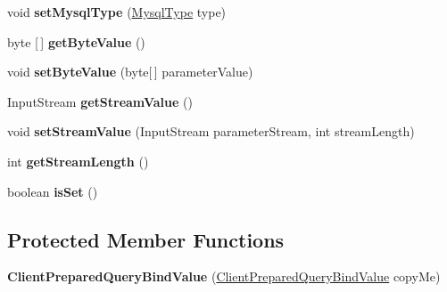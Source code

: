 \begin{DoxyCompactItemize}
\item 
\mbox{\label{classcom_1_1mysql_1_1cj_1_1_client_prepared_query_bind_value_a454d8f5fab8fd48d421a4678ad4aff40}} 
void {\bfseries set\+Mysql\+Type} (\mbox{\hyperlink{enumcom_1_1mysql_1_1cj_1_1_mysql_type}{Mysql\+Type}} type)
\item 
\mbox{\label{classcom_1_1mysql_1_1cj_1_1_client_prepared_query_bind_value_a4bd862b93770f5f4eca133257026a10c}} 
byte \mbox{[}$\,$\mbox{]} {\bfseries get\+Byte\+Value} ()
\item 
\mbox{\label{classcom_1_1mysql_1_1cj_1_1_client_prepared_query_bind_value_a2881b8e00374727ad118362e9c76b383}} 
void {\bfseries set\+Byte\+Value} (byte\mbox{[}$\,$\mbox{]} parameter\+Value)
\item 
\mbox{\label{classcom_1_1mysql_1_1cj_1_1_client_prepared_query_bind_value_a57dcbdd8ef4f98c2142bf6c6ee217035}} 
Input\+Stream {\bfseries get\+Stream\+Value} ()
\item 
\mbox{\label{classcom_1_1mysql_1_1cj_1_1_client_prepared_query_bind_value_a91a77d92aa03fd7a0ada64374a25e2fb}} 
void {\bfseries set\+Stream\+Value} (Input\+Stream parameter\+Stream, int stream\+Length)
\item 
\mbox{\label{classcom_1_1mysql_1_1cj_1_1_client_prepared_query_bind_value_aa3af5bfb0e74d1101afa4f093fdce32b}} 
int {\bfseries get\+Stream\+Length} ()
\item 
\mbox{\label{classcom_1_1mysql_1_1cj_1_1_client_prepared_query_bind_value_af2831a168b2afe1d429903340c13af2f}} 
boolean {\bfseries is\+Set} ()
\end{DoxyCompactItemize}
\subsection*{Protected Member Functions}
\begin{DoxyCompactItemize}
\item 
\mbox{\label{classcom_1_1mysql_1_1cj_1_1_client_prepared_query_bind_value_ad896429663b61815f28fdb813ebfd1d6}} 
{\bfseries Client\+Prepared\+Query\+Bind\+Value} (\mbox{\hyperlink{classcom_1_1mysql_1_1cj_1_1_client_prepared_query_bind_value}{Client\+Prepared\+Query\+Bind\+Value}} copy\+Me)
\end{DoxyCompactItemize}
